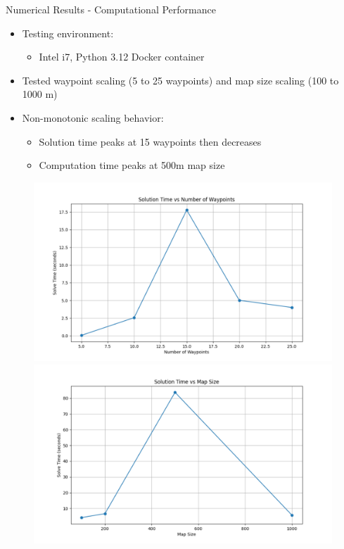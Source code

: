 \documentclass[11pt,xcolor={dvipsnames},hyperref={pdftex,pdfpagemode=UseNone,hidelinks,pdfdisplaydoctitle=true},usepdftitle=false]{beamer}
\begin{document}
      \begin{frame}{Numerical Results - Computational Performance}
        \begin{itemize}
          \item Testing environment: 
            \begin{itemize}
            \item Intel i7, Python 3.12 Docker container
          \end{itemize}
        \item Tested waypoint scaling (5 to 25 waypoints) and map size scaling (100 to 1000 m)
        \item Non-monotonic scaling behavior:
          \begin{itemize}
            \item Solution time peaks at 15 waypoints then decreases
            \item Computation time peaks at 500m map size
          \end{itemize}
      \end{itemize}
      
      \begin{figure}
        \centering
        \includegraphics[width=0.48\linewidth]{figures/waypoints_vs_time.pdf}
        \includegraphics[width=0.48\linewidth]{figures/map_size_vs_time.pdf}
      \end{figure}
    \end{frame}
\end{document}
